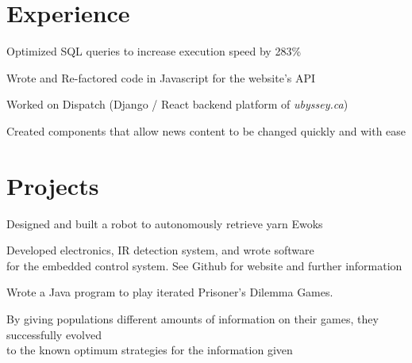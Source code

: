 \documentclass[]{deedy-resume-openfont}
\begin{document}

\section{Experience}

\begin{tightemize}
	\item Optimized SQL queries to increase execution speed by 283\%
	\item Wrote and Re-factored code in Javascript for the website’s API
\end{tightemize}
\sectionsep

\begin{tightemize}
	\item Worked on Dispatch (Django / React backend platform of \textit{ubyssey.ca})
	\item Created components that allow news content to be changed quickly and with ease
\end{tightemize}
\sectionsep

\section{Projects}

\begin{tightemize}
	\item Designed and built a robot to autonomously retrieve yarn Ewoks
	\item Developed electronics, IR detection system, and wrote software \\for the embedded control system. See Github for website and further information
\end{tightemize}
\sectionsep

\begin{tightemize}
	\item Wrote a Java program to play iterated Prisoner's Dilemma Games.
	\item By giving populations different amounts of information on their games, they successfully evolved \\to the known optimum strategies for the information given
\end{tightemize}
\sectionsep
\end{document}
